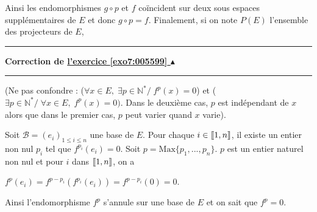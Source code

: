 \documentclass[11pt,a4paper]{article}
\newcommand{\Nn}{\mathbb{N}} \newcommand{\N}{\mathbb{N}}
\newcommand{\llbracket}{\left[\kern-0.15em\left[}
\newcommand{\rrbracket}{\right]\kern-0.15em\right]}
\newcounter{exo}
\newcommand{\correction}[1]{\hypertarget{cor7:#1}{}\label{cor7:#1}{\bf Correction de \hyperlink{exo7:#1}{l'exercice \ref{exo7:#1} $\blacktriangle$}}\vspace{1mm}\hrule\vspace{1mm}}
\newcommand{\fincorrection}{\vspace{1mm}\hrule\vspace*{7mm}}
\begin{document}
Ainsi les endomorphismes $g\circ p$ et $f$ coïncident sur deux sous espaces supplémentaires de $E$ et donc $g\circ p=f$. Finalement, si on note $P(E)$ l'ensemble des projecteurs de $E$,

\begin{center}
\end{center}
\fincorrection
\correction{005599}
(Ne pas confondre : ($\forall x\in E,\; \exists p\in\Nn^*/\;f^p(x)=0$) et ($\exists p\in\Nn^*/\;\forall x\in E,\;f^p(x) = 0)$. Dans le deuxième cas, $p$ est indépendant de $x$ alors que dans le premier cas, $p$ peut varier quand $x$ varie).

Soit $\mathcal{B}=(e_i)_{1\leqslant i\leqslant n}$ une base de $E$. Pour chaque $i\in\llbracket1,n\rrbracket$, il existe un entier non nul $p_i$ tel que $f^{p_i}(e_i)=0$. Soit $p=\text{Max}\{p_1,...,p_n\}$. $p$ est un entier naturel non nul et pour $i$ dans $\llbracket1,n\rrbracket$, on a

\begin{center}
$f^{p}(e_i)=f^{p-p_i}(f^{p_i}(e_i))=f^{p-p_i}(0)=0$.
\end{center}

Ainsi l'endomorphisme $f^p$ s'annule sur une base de $E$ et on sait que $f^p=0$.
\end{document}
